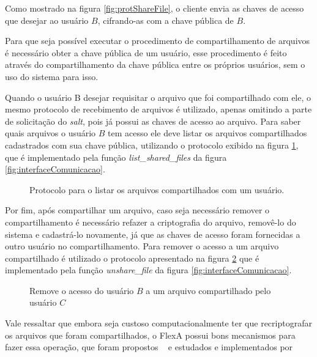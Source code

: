         Como mostrado na figura \ref{fig:protShareFile}, o cliente envia as chaves de acesso que desejar ao usuário $B$, cifrando-as com a chave pública de $B$.
        
        
        Para que seja possível executar o procedimento de compartilhamento de arquivos é necessário obter a chave pública de um usuário, esse procedimento é feito através do compartilhamento da chave pública entre os próprios usuários, sem o uso do sistema para isso.
        
        Quando o usuário B desejar requisitar o arquivo que foi compartilhado com ele, o mesmo protocolo de recebimento de arquivos é utilizado, apenas omitindo a parte de solicitação do \textit{salt}, pois já possui as chaves de acesso ao arquivo. Para saber quais arquivos o usuário $B$ tem acesso ele deve listar os arquivos compartilhados cadastrados com sua chave pública, utilizando o protocolo exibido na figura \ref{fig:protListSharedFiles}, que é implementado pela função \textit{list\_shared\_files} da figura \ref{fig:interfaceComunicacao}.
        
        
     \begin{figure}[!ht]
        \caption{Protocolo para o listar os arquivos compartilhados com um usuário.}
        \label{fig:protListSharedFiles}
        \end{figure}
        
        Por fim, após compartilhar um arquivo, caso seja necessário remover o compartilhamento é necessário refazer a criptografia do arquivo, removê-lo do sistema e cadastrá-lo novamente, já que as chaves de acesso foram fornecidas a outro usuário no compartilhamento. Para remover o acesso a um arquivo compartilhado é utilizado o protocolo apresentado na figura \ref{fig:protRemoveShare} que é implementado pela função \textit{unshare\_file} da figura \ref{fig:interfaceComunicacao}.
        
        \begin{figure}[!ht]
        \caption{Remove o acesso do usuário $B$ a um arquivo compartilhado pelo usuário $C$}
        \label{fig:protRemoveShare}
        \end{figure}
        
        Vale ressaltar que embora seja custoso computacionalmente ter que recriptografar os arquivos que foram compartilhados, o FlexA possui bons mecanismos para fazer essa operação, que foram propostos ~\cite{silas} e estudados e implementados por ~\cite{leandro} %
        
